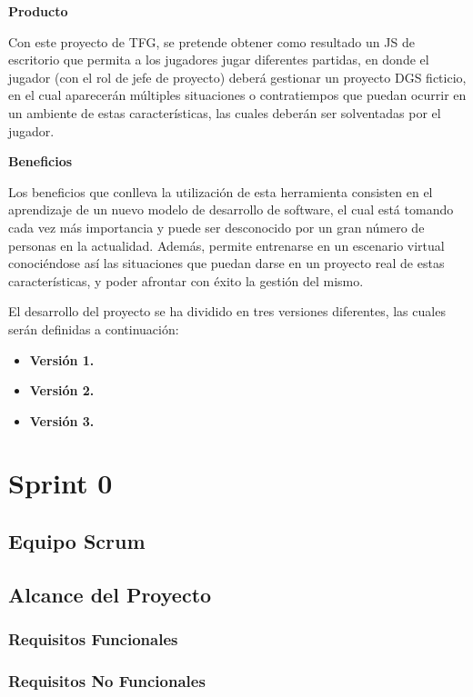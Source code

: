 \textbf{Producto}

Con este proyecto de TFG, se pretende obtener como resultado un JS de escritorio que permita a los jugadores jugar diferentes partidas, en donde el jugador (con el rol de jefe de proyecto) deberá gestionar un proyecto DGS ficticio, en el cual aparecerán múltiples situaciones o contratiempos que puedan ocurrir en un ambiente de estas características, las cuales deberán ser solventadas por el jugador.

\textbf{Beneficios}

Los beneficios que conlleva la utilización de esta herramienta consisten en el aprendizaje de un nuevo modelo de desarrollo de software, el cual está tomando cada vez más importancia y puede ser desconocido por un gran número de personas en la actualidad. Además, permite entrenarse en un escenario virtual conociéndose así las situaciones que puedan darse en un proyecto real de estas características, y poder afrontar con éxito la gestión del mismo.

El desarrollo del proyecto se ha dividido en tres versiones diferentes, las cuales serán definidas a continuación:

\begin{itemize}
	\item \textbf{Versión 1.}
	\item \textbf{Versión 2.}
	\item \textbf{Versión 3.}
\end{itemize}

\section{Sprint 0}
\label{sec:Sprint0}

\subsection{Equipo Scrum}
\label{sec:EquipoScrum}

\subsection{Alcance del Proyecto}
\label{sec:Alcance}

\subsubsection{Requisitos Funcionales}
\label{sec:RequisitosFuncionales}

\subsubsection{Requisitos No Funcionales}
\label{sec:RequisitosNoFuncionales}


